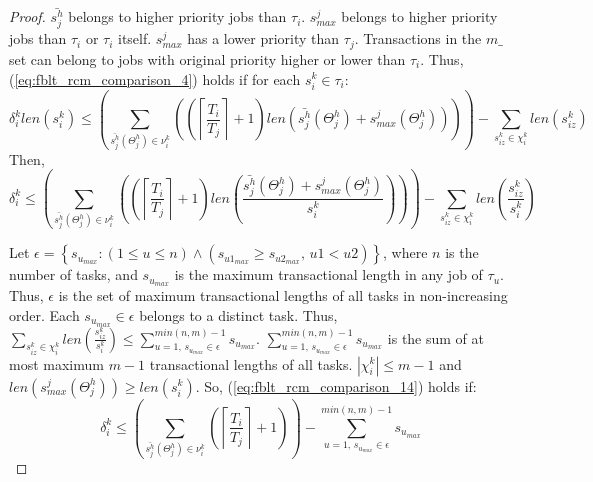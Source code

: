\documentclass[a4paper,english]{article}
\newtheorem{proof}{Proof}
\begin{document}
\begin{proof}
$\bar{s_{j}^{h}}$ belongs to higher priority jobs than $\tau_{i}$. $s_{max}^{j}$ belongs to higher priority jobs than $\tau_{i}$ or $\tau_{i}$ itself. $s_{max}^{j}$ has a lower priority than $\tau_j$. Transactions in the $m\_$set can belong to jobs
with original priority higher or lower than $\tau_{i}$. Thus, (\ref{eq:fblt_rcm_comparison_4})
holds if for each $s_{i}^{k}\in\tau_{i}$:
\begin{equation}
\delta_i^klen(s_{i}^{k})\le\left(\sum_{\bar{s_{j}^{h}}(\Theta_j^h)\in\nu_{i}^{k}}\left(\left(\left\lceil \frac{T_{i}}{T_{j}}\right\rceil +1\right)len\left(\bar{s_{j}^{h}}(\Theta_j^h)+s_{max}^{j}(\Theta_j^h)\right)\right)\right)-\sum_{s_{iz}^k\in \chi_i^k} len(s_{iz}^{k})\label{eq:fblt_rcm_comparison_5}
\end{equation}
Then,
\begin{equation}
\delta_i^k\le\left(\sum_{\bar{s_{j}^{h}}(\Theta_j^h)\in\nu_{i}^{k}}\left(\left(\left\lceil \frac{T_{i}}{T_{j}}\right\rceil +1\right)len\left(\frac{\bar{s_{j}^{h}}(\Theta_j^h)+s_{max}^{j}(\Theta_j^h)}{s_{i}^{k}}\right)\right)\right)-\sum_{s_{iz}^k \in \chi_i^k} len\left(\frac{s_{iz}^{k}}{s_{i}^{k}}\right)\label{eq:fblt_rcm_comparison_14}
\end{equation}

Let $\epsilon=\left\{s_{u_{max}}:(1\le u \le n)\wedge \left(s_{u1_{max}} \ge s_{u2_{max}},\,u1 < u2 \right)\right\}$, where $n$ is the number of tasks, and $s_{u_{max}}$ is the maximum transactional length in any job of $\tau_u$. Thus, $\epsilon$ is the set of maximum transactional lengths of all tasks in non-increasing order. Each $s_{u_{max}} \in \epsilon$ belongs to a distinct task. Thus, $\sum_{s_{iz}^{k} \in \chi_i^k}len\left(\frac{s_{iz}^{k}}{s_{i}^{k}}\right)\le \sum_{u=1,\,s_{u_{max}}\in \epsilon}^{min(n,m)-1} s_{u_{max}}$. $\sum_{u=1,\,s_{u_{max}}\in \epsilon}^{min(n,m)-1} s_{u_{max}}$ is the sum of at most maximum $m-1$ transactional lengths of all tasks. $|\chi_i^k|\le m-1$ and $len(s_{max}^{j}(\Theta_j^h)) \ge len(s_{i}^{k})$. So, (\ref{eq:fblt_rcm_comparison_14})
holds if: 
\begin{equation}
\delta_i^k\le\left(\sum_{\bar{s_{j}^{h}}(\Theta_j^h)\in\nu_{i}^{k}}\left(\left\lceil \frac{T_{i}}{T_{j}}\right\rceil +1\right)\right)-\sum_{u=1,\,s_{u_{max}}\in \epsilon}^{min(n,m)-1} s_{u_{max}} \label{eq:fblt_rcm_comparison_15}
\end{equation}


\end{proof}
\end{document}
